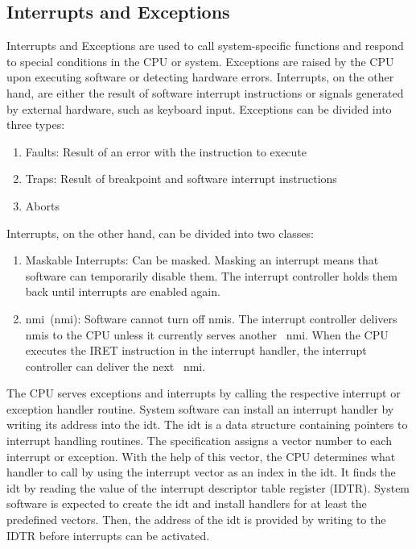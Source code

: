 \subsection{Interrupts and Exceptions}
\label{sec:state:technical:interrupts}
Interrupts and Exceptions are used to call system-specific functions and respond
to special conditions in the CPU or system. Exceptions are raised by the CPU
upon executing software or detecting hardware errors. Interrupts, on the other
hand, are either the result of software interrupt instructions or signals
generated by external hardware, such as keyboard input. Exceptions can be
divided into three types:
\begin{enumerate}
    \item Faults: Result of an error with the instruction to execute
    \item Traps: Result of breakpoint and software interrupt instructions
    \item Aborts
\end{enumerate}
Interrupts, on the other hand, can be divided into two classes:
\begin{enumerate}
    \item Maskable Interrupts: Can be masked. Masking an interrupt means that
          software can temporarily disable them. The interrupt controller holds
          them back until interrupts are enabled again.
    \item \Gls{nmi}~(\gls{nmi}): Software cannot turn off
          \glspl{nmi}. The interrupt controller delivers~
          \glspl{nmi} to the CPU unless it currently serves another~
          \gls{nmi}. When the CPU executes the IRET instruction in the
          interrupt handler, the interrupt controller can deliver the next~
          \gls{nmi}.
\end{enumerate}
The CPU serves exceptions and interrupts by calling the respective interrupt or
exception handler routine. System software can install an interrupt handler by
writing its address into the \gls{idt}. The
\gls{idt} is a data structure containing pointers to interrupt handling
routines. The specification assigns a vector number to each interrupt or
exception. With the help of this vector, the CPU determines what handler to call
by using the interrupt vector as an index in the \gls{idt}. It finds the
\gls{idt} by reading the value of the interrupt descriptor table register
(IDTR). System software is expected to create the \gls{idt} and install
handlers for at least the predefined vectors. Then, the address of the
\gls{idt} is provided by writing to the IDTR before interrupts can be
activated. \\

